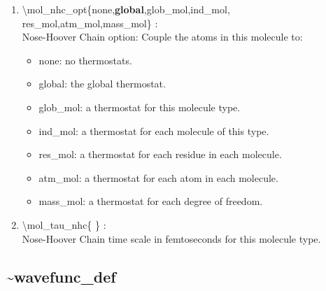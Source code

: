 \documentclass[12pt,titlepage]{article}
\begin{document}
\begin{enumerate}
 \vspace{0.15in} 
 \item  \textbackslash{}mol\_nhc\_opt\{none,{\bf global},glob\_mol,ind\_mol,\\ 
                 \hspace*{0.5in}res\_mol,atm\_mol,mass\_mol\} :  \\
   Nose-Hoover Chain option: Couple the atoms in this molecule to:
      \begin{itemize}
         \item none:     no thermostats.
         \item global:   the global thermostat.
         \item glob\_mol: a thermostat for this molecule type. 
         \item ind\_mol:  a thermostat for each molecule of this type. 
         \item res\_mol:  a thermostat for each residue in each molecule.
         \item atm\_mol:  a thermostat for each atom in each molecule.
         \item mass\_mol: a thermostat for each degree of freedom.
      \end{itemize}

 \vspace{0.15in} 
 \item  \textbackslash{}mol\_tau\_nhc\{ \} : \\
   Nose-Hoover Chain time scale in femtoseconds for this molecule type.

\end{enumerate}

\newpage
\subsection*{\bf \~{}wavefunc\_def}
\end{document}

